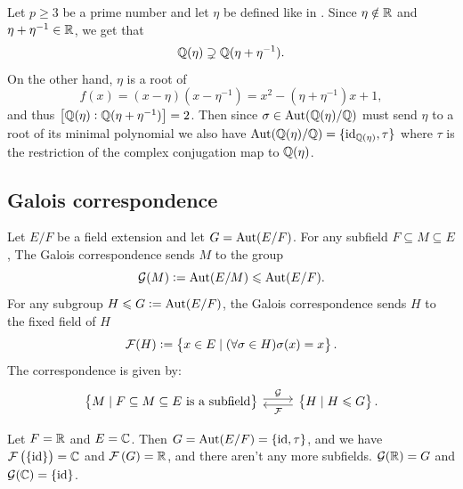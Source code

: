 \documentclass[11pt,a4paper]{article}
\begin{document}
\begin{example}
  \label{exmp:eta-eta}
  Let $p \geq 3$ be a prime number and let $\eta$ be defined like in
  .
  Since $\eta \notin \mathbb{R}$ and $\eta + \eta^{-1} \in \mathbb{R}$,
  we get that
  \[
    \mathbb{Q}(\eta) \supsetneq \mathbb{Q}(\eta + \eta^{-1}).
  \]
  On the other hand, $\eta$ is a root of
  \[
    f(x) =
    (x - \eta)(x - \eta^{-1}) =
    x^{2} - (\eta + \eta^{-1})x + 1,
  \]
  and thus $\left[\mathbb{Q}(\eta) : \mathbb{Q}(\eta + \eta^{-1})\right] = 2$.
  Then since $\sigma \in \operatorname{Aut}(\mathbb{Q}(\eta)/\mathbb{Q})$ must send $\eta$
  to a root of its minimal polynomial
  we also have $\operatorname{Aut}(\mathbb{Q}(\eta)/\mathbb{Q}) = \{\operatorname{id}_{\mathbb{Q}(\eta)},\tau\}$
  where $\tau$ is the restriction of the complex conjugation map to
  $\mathbb{Q}(\eta)$.
\end{example}


\subsection{Galois correspondence}
\begin{definition}
  Let $E/F$ be a field extension and let $G = \operatorname{Aut}(E/F)$.
  For any subfield $F \subseteq M \subseteq E$,
  The Galois correspondence sends $M$ to the group
  \[
    \mathcal G(M) := \operatorname{Aut}(E/M) \leqslant \operatorname{Aut}(E/F).
  \]
  For any subgroup $H \leqslant G := \operatorname{Aut}(E/F)$,
  the Galois correspondence sends $H$ to the fixed field of $H$
  \[
    \mathcal F(H) := \left\{x \in E \mid (\forall \sigma \in H) \sigma(x) = x\right\}.
  \]
  The correspondence is given by:
  \[
  \begin{tikzcd}
    \set{M \mid F \subseteq M \subseteq E \text{ is a subfield}}
    \arrow[r, shift left, "\GG"] &
    \set{H \mid H \leqslant G}
    \arrow[l, shift left, "\FF"].
  \end{tikzcd}
  \]
\end{definition}

\begin{example}
  Let $F = \mathbb{R}$ and $E = \mathbb{C}$.
  Then $G = \operatorname{Aut}(E/F) = \left\{\operatorname{id},\tau\right\}$, and we have
  $\FF\del{\set{\id}} = \C$ and $\FF\del{G} = \R$,
  and there aren't any more subfields.
  $\mathcal G(\mathbb{R}) = G$ and $\mathcal G(\mathbb{C}) = \left\{\operatorname{id}\right\}$.
\end{example}
\end{document}
